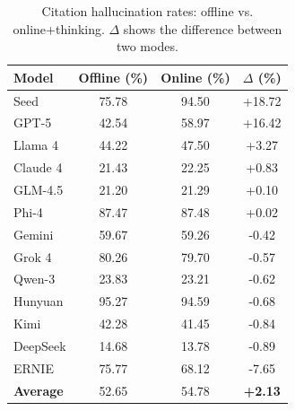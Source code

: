 
\begin{table}[t]
  \centering
  \begin{threeparttable}
    \caption{Citation hallucination rates: offline vs. online+thinking. $\Delta$ shows the difference between two modes.}
    \label{tab:online_impact}
    \small
{}
\begin{tabular}{lccc}
\toprule
\textbf{Model} & \cellcolor{red!12}\textbf{Offline (\%)} & \cellcolor{red!12}\textbf{Online (\%)} & \textbf{$\Delta$ (\%)} \\
\midrule
Seed & \cellcolor{red!30}75.78 & \cellcolor{red!34}94.50 & \cellcolor{red!18}+18.72 \\
GPT-5 & \cellcolor{red!20}42.54 & \cellcolor{red!24}58.97 & \cellcolor{red!16}+16.42 \\
Llama 4 & \cellcolor{red!20}44.22 & \cellcolor{red!20}47.50 & \cellcolor{red!10}+3.27 \\
Claude 4 & \cellcolor{red!12}21.43 & \cellcolor{red!12}22.25 & \cellcolor{red!8}+0.83 \\
GLM-4.5 & \cellcolor{red!12}21.20 & \cellcolor{red!12}21.29 & \cellcolor{red!6}+0.10 \\
Phi-4 & \cellcolor{red!34}87.47 & \cellcolor{red!34}87.48 & \cellcolor{red!6}+0.02 \\
Gemini & \cellcolor{red!24}59.67 & \cellcolor{red!24}59.26 & \cellcolor{green!6}-0.42 \\
Grok 4 & \cellcolor{red!30}80.26 & \cellcolor{red!30}79.70 & \cellcolor{green!6}-0.57 \\
Qwen-3 & \cellcolor{red!12}23.83 & \cellcolor{red!12}23.21 & \cellcolor{green!6}-0.62 \\
Hunyuan & \cellcolor{red!34}95.27 & \cellcolor{red!34}94.59 & \cellcolor{green!6}-0.68 \\
Kimi & \cellcolor{red!20}42.28 & \cellcolor{red!20}41.45 & \cellcolor{green!8}-0.84 \\
DeepSeek & \cellcolor{red!10}14.68 & \cellcolor{red!10}13.78 & \cellcolor{green!8}-0.89 \\
ERNIE & \cellcolor{red!30}75.77 & \cellcolor{red!28}68.12 & \cellcolor{green!10}-7.65 \\
\midrule
\textbf{Average} & \cellcolor{red!22}52.65 & \cellcolor{red!24}54.78 & \cellcolor{red!10}\textbf{+2.13} \\
\bottomrule
\end{tabular}
  \end{threeparttable}
\end{table}

